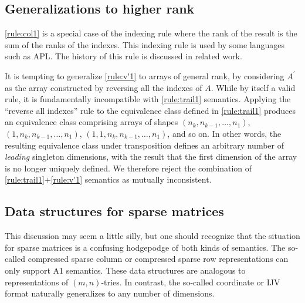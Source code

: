
\subsection{Generalizations to higher rank}

\ref{rule:col1} is a special case of the indexing rule where the rank of the
result is the sum of the ranks of the indexes. This indexing rule is used by
some languages such as APL. The history of this rule is discussed in
related work.

It is tempting to generalize \ref{rule:v'1} to arrays of general rank, by
considering $A^\prime$ as the array constructed by reversing all the indexes of
$A$. While by itself a valid rule, it is fundamentally incompatible with
\ref{rule:trail1} semantics. Applying the ``reverse all indexes'' rule to the
equivalence class defined in \ref{rule:trail1} produces an equivalence class
comprising arrays of shapes $(n_k, n_{k-1}, \dots, n_1)$, $(1, n_k, n_{k-1},
\dots, n_1)$, $(1, 1, n_k, n_{k-1}, \dots, n_1)$, and so on. In other words,
the resulting equivalence class under transposition defines an arbitrary number
of \textit{leading} singleton dimensions, with the result that the first
dimension of the array is no longer uniquely defined. We therefore reject the
combination of \ref{rule:trail1}+\ref{rule:v'1} semantics as mutually
inconsistent.



\subsection{Data structures for sparse matrices}

This discussion may seem a little silly, but one should recognize
that the situation for sparse matrices is a confusing hodgepodge of
both kinds of semantics. The so-called compressed sparse column or
compressed sparse row representations can only support A1 semantics.
These data structures are analogous to representations of $\left(m,n\right)$-tries.
In contrast, the so-called coordinate or IJV format naturally generalizes
to any number of dimensions.


